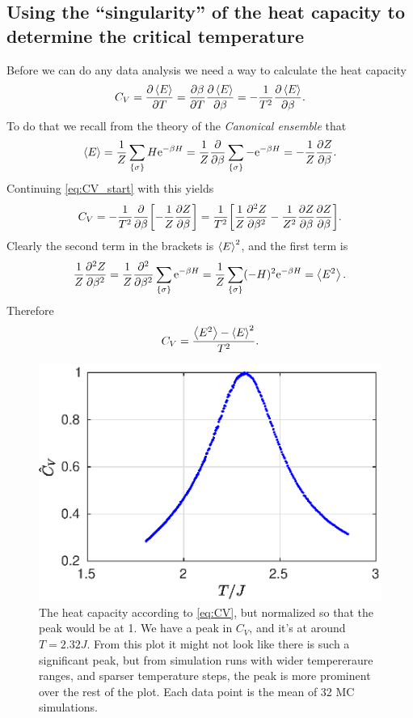 \documentclass[11pt,letter, swedish, english
]{article}
\begin{document}
\subsection{Using the ``singularity'' of the heat capacity to determine the critical temperature}
Before we can do any data analysis we need a way to calculate the heat
capacity
\begin{equation}\label{eq:CV_start}
C_V = \pdv{\ev{E}}{T} = \pdv{\beta}{T}\pdv{\ev{E}}{\beta} 
= -\frac{1}{T^2}\pdv{\ev{E}}{\beta}.
\end{equation}
To do that we recall from the theory of the 
\emph{Canonical ensemble} that 
\begin{equation}
\ev{E} = \frac{1}{Z}\sum_{\{\sigma\}} H\ee^{-\beta H}
= \frac{1}{Z} \pdv{\beta}\sum_{\{\sigma\}} -\ee^{-\beta H}
= -\frac{1}{Z} \pdv{Z}{\beta}.
\end{equation}
Continuing \eqref{eq:CV_start} with this yields
\begin{equation}
C_V = -\frac{1}{T^2}\pdv{\beta}
\qty[-\frac{1}{Z} \pdv{Z}{\beta}]
=\frac{1}{T^2}\qty[
\frac{1}{Z} \pdv[2]{Z}{\beta}
-\frac{1}{Z^2} \pdv{Z}{\beta}\pdv{Z}{\beta}].
\end{equation}
Clearly the second term in the brackets is $\ev{E}^2$, and the first
term is
\begin{equation}
\frac{1}{Z} \pdv[2]{Z}{\beta}
=\frac{1}{Z} \pdv[2]{\beta}\sum_{\{\sigma\}} \ee^{-\beta H}
=\frac{1}{Z} \sum_{\{\sigma\}} (-H)^2 \ee^{-\beta H}
= \ev{E^2}.
\end{equation}
Therefore
\begin{equation}\label{eq:CV}
C_V = \frac{\ev{E^2}-\ev{E}^2}{T^2}.
\end{equation}

\begin{figure}
\centering
\includegraphics[width=.6\textwidth]{CV_L-16_Nsteps-8196_Nmean-32.eps}
\caption{The heat capacity according to \eqref{eq:CV}, but normalized
  so that the peak would be at 1. We have a peak in $C_V$, and it's at
  around $T=2.32J$. From this plot it might not look like there is such
  a significant peak, but from simulation runs with wider tempereraure
  ranges, and sparser temperature steps, the peak is more prominent
  over the rest of the plot.
  Each data point is the mean of 32 MC simulations. } 
\label{fig:CV1}
\end{figure}
\end{document}

